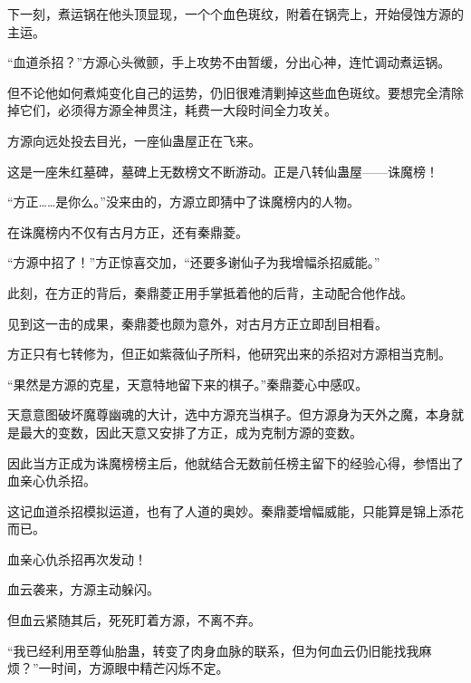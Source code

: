\begin{this_body}
下一刻，煮运锅在他头顶显现，一个个血色斑纹，附着在锅壳上，开始侵蚀方源的主运。

“血道杀招？”方源心头微颤，手上攻势不由暂缓，分出心神，连忙调动煮运锅。

但不论他如何煮炖变化自己的运势，仍旧很难清剿掉这些血色斑纹。要想完全清除掉它们，必须得方源全神贯注，耗费一大段时间全力攻关。

方源向远处投去目光，一座仙蛊屋正在飞来。

这是一座朱红墓碑，墓碑上无数榜文不断游动。正是八转仙蛊屋——诛魔榜！

“方正……是你么。”没来由的，方源立即猜中了诛魔榜内的人物。

在诛魔榜内不仅有古月方正，还有秦鼎菱。

“方源中招了！”方正惊喜交加，“还要多谢仙子为我增幅杀招威能。”

此刻，在方正的背后，秦鼎菱正用手掌抵着他的后背，主动配合他作战。

见到这一击的成果，秦鼎菱也颇为意外，对古月方正立即刮目相看。

方正只有七转修为，但正如紫薇仙子所料，他研究出来的杀招对方源相当克制。

“果然是方源的克星，天意特地留下来的棋子。”秦鼎菱心中感叹。

天意意图破坏魔尊幽魂的大计，选中方源充当棋子。但方源身为天外之魔，本身就是最大的变数，因此天意又安排了方正，成为克制方源的变数。

因此当方正成为诛魔榜榜主后，他就结合无数前任榜主留下的经验心得，参悟出了血亲心仇杀招。

这记血道杀招模拟运道，也有了人道的奥妙。秦鼎菱增幅威能，只能算是锦上添花而已。

血亲心仇杀招再次发动！

血云袭来，方源主动躲闪。

但血云紧随其后，死死盯着方源，不离不弃。

“我已经利用至尊仙胎蛊，转变了肉身血脉的联系，但为何血云仍旧能找我麻烦？”一时间，方源眼中精芒闪烁不定。

\end{this_body}

